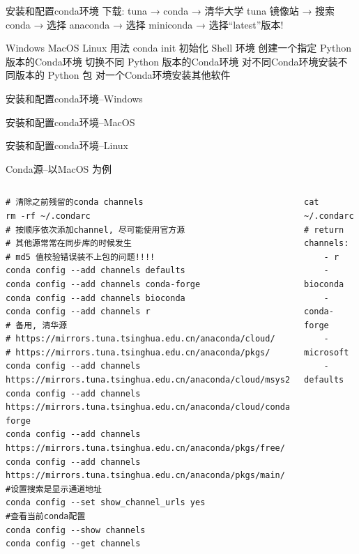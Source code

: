 \begin{frame}[standout]{安装和配置conda环境}
    下载: tuna → conda → 清华大学 tuna 镜像站 → 搜索 conda → 选择 anaconda → 选择 miniconda → 选择``latest''版本!
    \begin{myoutline}
        \1 Windows
        \1 MacOS
        \1 Linux
        \1 用法
            \2 conda init 初始化 Shell 环境
            \2 创建一个指定 Python 版本的Conda环境
            \2 切换不同 Python 版本的Conda环境
            \2 对不同Conda环境安装不同版本的 Python 包
            \2 对一个Conda环境安装其他软件
    \end{myoutline}
\end{frame}

\begin{frame}[standout]安装和配置conda环境--Windows\end{frame}
\begin{frame}[standout]安装和配置conda环境--MacOS\end{frame}
\begin{frame}[standout]安装和配置conda环境--Linux\end{frame}




\begin{frame}[fragile]{Conda源--以MacOS 为例}
    \begin{columns}
        \begin{lstlisting}
# 清除之前残留的conda channels
rm -rf ~/.condarc
# 按顺序依次添加channel, 尽可能使用官方源
# 其他源常常在同步库的时候发生
# md5 值校验错误装不上包的问题!!!!
conda config --add channels defaults
conda config --add channels conda-forge
conda config --add channels bioconda
conda config --add channels r
# 备用, 清华源
# https://mirrors.tuna.tsinghua.edu.cn/anaconda/cloud/
# https://mirrors.tuna.tsinghua.edu.cn/anaconda/pkgs/
conda config --add channels https://mirrors.tuna.tsinghua.edu.cn/anaconda/cloud/msys2/
conda config --add channels https://mirrors.tuna.tsinghua.edu.cn/anaconda/cloud/conda-forge
conda config --add channels https://mirrors.tuna.tsinghua.edu.cn/anaconda/pkgs/free/
conda config --add channels https://mirrors.tuna.tsinghua.edu.cn/anaconda/pkgs/main/
#设置搜索是显示通道地址
conda config --set show_channel_urls yes
#查看当前conda配置
conda config --show channels
conda config --get channels
        \end{lstlisting}
        \begin{lstlisting}
cat ~/.condarc
# return
channels:
    - r
    - bioconda
    - conda-forge
    - microsoft
    - defaults
        \end{lstlisting}
    \end{columns}
\end{frame}


